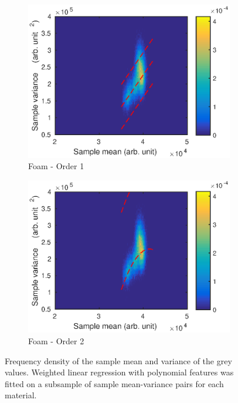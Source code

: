 \documentclass[12pt]{report}
\begin{document}
\begin{figure}
\begin{subfigure}{0.45\textwidth}
		\includegraphics[width=\textwidth]{figures/meanVar/subsample_foam1.eps}
		\caption{Foam - Order 1}
	\end{subfigure}
	\begin{subfigure}{0.45\textwidth}
		\includegraphics[width=\textwidth]{figures/meanVar/subsample_foam2.eps}
		\caption{Foam - Order 2}
	\end{subfigure}
	\caption{Frequency density of the sample mean and variance of the grey values. Weighted linear regression with polynomial features was fitted on a subsample of sample mean-variance pairs for each material.}
	\label{fig:subsample_meanVar}
\end{figure}
\end{document}
